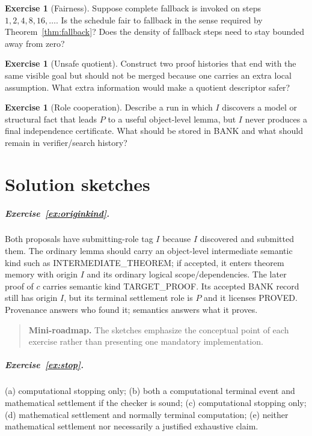 \documentclass[11pt,openany]{book}
\theoremstyle{definition}
\newtheorem{exercise}[theorem]{Exercise}
\theoremstyle{remark}
\newenvironment{miniroadmap}{\begin{quote}\small\color{deepblue}\textbf{Mini-roadmap.} }{\end{quote}}
\begin{document}
\begin{exercise}[Fairness]\label{ex:fair}
Suppose complete fallback is invoked on steps $1,2,4,8,16,\ldots$. Is the schedule fair to fallback in the sense required by Theorem~\ref{thm:fallback}? Does the density of fallback steps need to stay bounded away from zero?
\end{exercise}

\begin{exercise}[Unsafe quotient]\label{ex:unsafeq}
Construct two proof histories that end with the same visible goal but should not be merged because one carries an extra local assumption. What extra information would make a quotient descriptor safer?
\end{exercise}

\begin{exercise}[Role cooperation]\label{ex:coop}
Describe a run in which $I$ discovers a model or structural fact that leads $P$ to a useful object-level lemma, but $I$ never produces a final independence certificate. What should be stored in BANK and what should remain in verifier/search history?
\end{exercise}

\chapter{Solution sketches}

\paragraph{Exercise~\ref{ex:originkind}.}
Both proposals have submitting-role tag $I$ because $I$ discovered and submitted them. The ordinary lemma should carry an object-level intermediate semantic kind such as \textsf{INTERMEDIATE\_THEOREM}; if accepted, it enters theorem memory with origin $I$ and its ordinary logical scope/dependencies. The later proof of $c$ carries semantic kind \textsf{TARGET\_PROOF}. Its accepted BANK record still has origin $I$, but its terminal settlement role is $P$ and it licenses \textsf{PROVED}. Provenance answers who found it; semantics answers what it proves.
\begin{miniroadmap}
The sketches emphasize the conceptual point of each exercise rather than presenting one mandatory implementation.
\end{miniroadmap}

\paragraph{Exercise~\ref{ex:stop}.}
(a) computational stopping only; (b) both a computational terminal event and mathematical settlement if the checker is sound; (c) computational stopping only; (d) mathematical settlement and normally terminal computation; (e) neither mathematical settlement nor necessarily a justified exhaustive claim.
\end{document}
